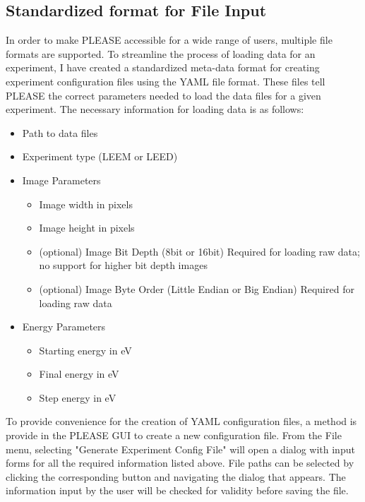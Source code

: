 \subsection{Standardized format for File Input}
In order to make PLEASE accessible for a wide range of users, multiple file formats are supported. To streamline the process of loading data for an experiment, I have created a standardized meta-data format for creating experiment configuration files using the YAML file format. These files tell PLEASE the correct parameters needed to load the data files for a given experiment. The necessary information for loading data is as follows:

\begin{itemize}
\item Path to data files
\item Experiment type (LEEM or LEED)
\item Image Parameters
    \begin{itemize}
       \item Image width in pixels
       \item Image height in pixels
       \item (optional) Image Bit Depth (8bit or 16bit) Required for loading raw data; no support for higher bit depth images
       \item (optional) Image Byte Order (Little Endian or Big Endian) Required for loading raw data
    \end{itemize}
\item Energy Parameters
     \begin{itemize}
       \item Starting energy in eV
       \item Final energy in eV
       \item Step energy in eV
     \end{itemize}
\end{itemize}

To provide convenience for the creation of YAML configuration files, a method is provide in the PLEASE GUI to create a new configuration file. From the File menu, selecting "Generate Experiment Config File" will open a dialog with input forms for all the required information listed above. File paths can be selected by clicking the corresponding button and navigating the dialog that appears. The information input by the user will be checked for validity before saving the file.

